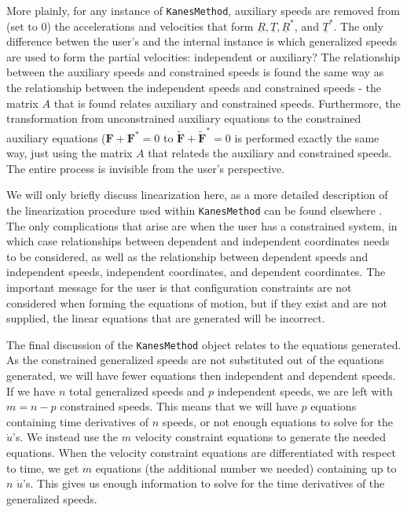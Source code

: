\documentclass[twocolumn,10pt]{asme2e}
\begin{document}
More plainly, for any instance of \verb|KanesMethod|, auxiliary speeds are
removed from (set to 0) the accelerations and velocities that form
$\underline{R}, \underline{T}, \underline{R}^*$, and $\underline{T}^*$.
The only difference betwen the user's and the internal instance is which
generalized speeds are used to form the partial velocities: independent or
auxiliary?
The relationship between the auxiliary speeds and constrained speeds is found
the same way as the relationship between the independent speeds and constrained
speeds - the matrix $A$ that is found relates auxiliary and constrained
speeds.
Furthermore, the transformation from unconstrained auxiliary equations to the
constrained auxiliary equations ($\mathbf{F} + \mathbf{F}^*=0$ to
$\tilde{\mathbf{F}} + \tilde{\mathbf{F}}^* = 0$ is performed exactly the same
way, just using the matrix $A$ that relateds the auxiliary and constrained
speeds.
The entire process is invisible from the user's perspective.

We will only briefly discuss linearization here, as a more detailed description
of the linearization procedure used within \verb|KanesMethod| can be found
elsewhere \cite{Peterson2013}.
The only complications that arise are when the user has a constrained system,
in which case relationships between dependent and independent coordinates needs
to be considered, as well as the relationship between dependent speeds and
independent speeds, independent coordinates, and dependent coordinates.
The important message for the user is that configuration constraints are not
considered when forming the equations of motion, but if they exist and are not
supplied, the linear equations that are generated will be incorrect.

The final discussion of the \verb|KanesMethod| object relates to the equations
generated.
As the constrained generalized speeds are not substituted out of the equations
generated, we will have fewer equations then independent and dependent speeds.
If we have $n$ total generalized speeds and $p$ independent speeds, we are left
with $m=n-p$ constrained speeds.
This means that we will have $p$ equations containing time derivatives of $n$
speeds, or not enough equations to solve for the $\dot{u}$'s.
We instead use the $m$ velocity constraint equations to generate the needed
equations.
When the velocity constraint equations are differentiated with respect to time,
we get $m$ equations (the additional number we needed) containing up to $n$
$\dot{u}$'s.
This gives us enough information to solve for the time derivatives of the
generalized speeds.
\end{document}
